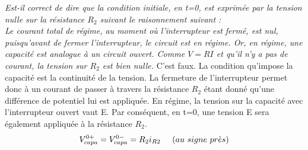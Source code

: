 \Question
{
\textit{Est-il correct de dire que la condition initiale, en t=0, est exprimée par la tension nulle sur la résistance $R_{2}$ suivant le raisonnement suivant :\\
\og Le courant total de régime, au moment où l’interrupteur est fermé, est nul, puisqu’avant de fermer l’interrupteur, le circuit est en régime. Or, en régime, une capacité est analogue à un circuit ouvert. Comme $V=RI$ et qu'il n'y a pas de courant, la tension sur $R_{2}$ est bien nulle.\fg}
}
{%
C’est faux. La condition qu’impose la capacité est la continuité de la tension. La fermeture de l’interrupteur permet donc à un courant  de passer à travers la résistance $R_2$ étant donné qu’une différence de potentiel lui est appliquée. En régime, la tension sur la capacité avec l’interrupteur ouvert vaut E. Par conséquent, en t=0, une tension E sera également appliquée à la résistance $R_2$. 
$$V_{capa}^{0+}=V_{capa}^{0-}=R_{2}i_{R2}\hspace{5mm}(au\ signe\ pr\grave{e}s)$$
}

